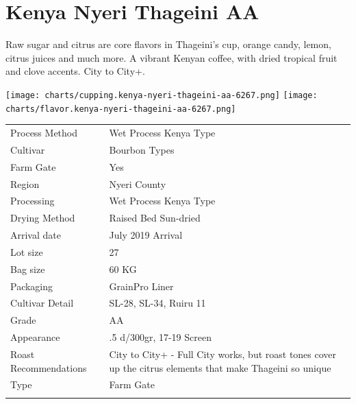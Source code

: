 \documentclass[10pt,twoside,footinclude=true,headinclude=true]{scrbook} %
\newlength{\mysize}
\newcommand{\myfontsize}[1]{
  \setlength{\mysize}{#1pt}
  \fontsize{\mysize}{1.2\mysize}
  \selectfont
}
\begin{document}

\chapter*{Kenya Nyeri Thageini AA}
 
\begin{addmargin}[2.2em]{2.2em}
\small
\justify
Raw sugar and citrus are core flavors in Thageini's cup, orange candy, lemon, citrus juices and much more. A vibrant Kenyan coffee, with dried tropical fruit and clove accents. City to City+.
\end{addmargin}

\centering
\vspace{2em}
\texttt{[image: charts/cupping.kenya-nyeri-thageini-aa-6267.png]}
\texttt{[image: charts/flavor.kenya-nyeri-thageini-aa-6267.png]}

\vspace{1em}
\begin{table}[htbp]
\myfontsize{7}
\hspace*{2.2em}
\begin{tabular}{ >{\raggedleft\arraybackslash}p{3.6cm}!{\color{lightgray}\vrule}p{7cm} }
\hline
  Process Method & Wet Process Kenya Type \\
  \hline
  Cultivar & Bourbon Types \\
  \hline
  Farm Gate & Yes \\
  \hline
  Region & Nyeri County \\
  \hline
  Processing & Wet Process Kenya Type \\
  \hline
  Drying Method & Raised Bed Sun-dried \\
  \hline
  Arrival date & July 2019 Arrival \\
  \hline
  Lot size & 27 \\
  \hline
  Bag size & 60 KG \\
  \hline
  Packaging & GrainPro Liner \\
  \hline
  Cultivar Detail & SL-28, SL-34, Ruiru 11 \\
  \hline
  Grade & AA \\
  \hline
  Appearance & .5 d/300gr, 17-19 Screen \\
  \hline
  Roast Recommendations & City to City+ - Full City works, but roast tones cover up the citrus elements that make Thageini so unique \\
  \hline
  Type & Farm Gate \\
  \hline

\end{tabular}
\end{table}
\end{document}
